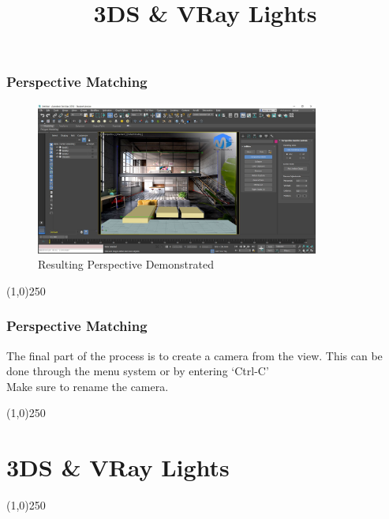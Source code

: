 \begin{frame}
	\frametitle{Perspective Matching}
	\begin{figure}
		\centering
		\includegraphics[height=5cm]{./img/PerspectiveMatching/7.jpg}
		\caption[Resulting Perspective Demonstrated]{Resulting Perspective Demonstrated}
		\label{fig:PerspectiveMatch7}
	\end{figure}
\end{frame}
\begin{center}\line(1,0){250}\end{center}


\begin{frame}
	\frametitle{Perspective Matching}
	The final part of the process is to create a camera from the view.  This can be done through the menu system or by entering `Ctrl-C'\\
	Make sure to rename the camera.
	
\end{frame}
\begin{center}\line(1,0){250}\end{center}




\section{3DS \& VRay Lights}
\begin{frame}
\title[3DS \& VRay Lights]{3DS \& VRay Lights}
\titlepage
\end{frame}\begin{center}\line(1,0){250}\end{center}


